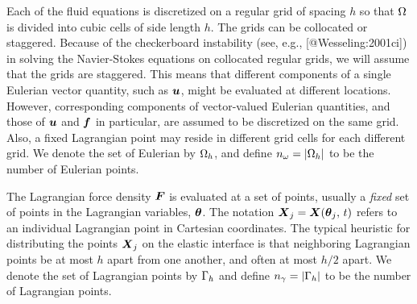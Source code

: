 Each of the fluid equations is discretized on a regular grid of spacing $h$ so
that $\Omega$ is divided into cubic cells of side length $h$. The grids can be
collocated or staggered. Because of the checkerboard instability (see, e.g.,
[@Wesseling:2001ci]) in solving the Navier-Stokes equations on collocated
regular grids, we will assume that the grids are staggered. This means that
different components of a single Eulerian vector quantity, such as $\boldsymbol{u}$,
might be evaluated at different locations. However, corresponding components of
vector-valued Eulerian quantities, and those of $\boldsymbol{u}$ and $\boldsymbol{f}$ in particular,
are assumed to be discretized on the same grid. Also, a fixed Lagrangian point
may reside in different grid cells for each different grid. We denote the set
of Eulerian by $\Omega_h$, and define $n_\omega = |\Omega_h|$ to be the
number of Eulerian points.

The Lagrangian force density $\boldsymbol{F}$ is evaluated at a set of points, usually a
\emph{fixed} set of points in the Lagrangian variables, $\boldsymbol{\theta}$. The notation
$\boldsymbol{X}_j=\boldsymbol{X}(\boldsymbol{\theta}_j,\,t)$ refers to an individual Lagrangian point in Cartesian
coordinates. The typical heuristic for distributing the points $\boldsymbol{X}_j$ on the
elastic interface is that neighboring Lagrangian points be at most $h$ apart
from one another, and often at most $h/2$ apart. We denote the set of
Lagrangian points by $\Gamma_h$ and define $n_\gamma = |\Gamma_h|$ to
be the number of Lagrangian points.


